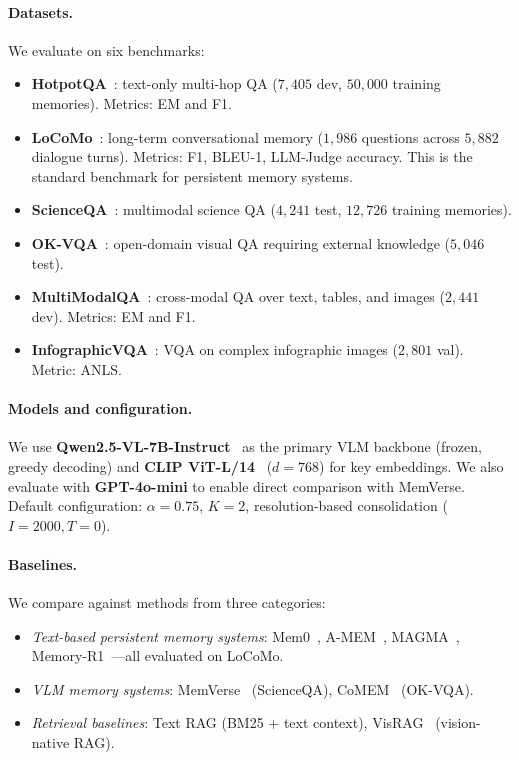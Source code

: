 \documentclass{article}
\begin{document}
\paragraph{Datasets.}
We evaluate on six benchmarks:
\begin{itemize}[nosep,leftmargin=*]
  \item \textbf{HotpotQA}~\citep{yang2018hotpotqa}: text-only multi-hop QA ($7{,}405$ dev, $50{,}000$ training memories). Metrics: EM and F1.
  \item \textbf{LoCoMo}~\citep{maharana2024locomo}: long-term conversational memory ($1{,}986$ questions across $5{,}882$ dialogue turns). Metrics: F1, BLEU-1, LLM-Judge accuracy. This is the standard benchmark for persistent memory systems.
  \item \textbf{ScienceQA}~\citep{lu2022learn}: multimodal science QA ($4{,}241$ test, $12{,}726$ training memories).
  \item \textbf{OK-VQA}~\citep{marino2019okvqa}: open-domain visual QA requiring external knowledge ($5{,}046$ test).
  \item \textbf{MultiModalQA}~\citep{talmor2021multimodalqa}: cross-modal QA over text, tables, and images ($2{,}441$ dev). Metrics: EM and F1.
  \item \textbf{InfographicVQA}~\citep{mathew2022infographicvqa}: VQA on complex infographic images ($2{,}801$ val). Metric: ANLS.
\end{itemize}

\paragraph{Models and configuration.}
We use \textbf{Qwen2.5-VL-7B-Instruct}~\citep{bai2025qwen25vl} as the primary VLM backbone (frozen, greedy decoding) and \textbf{CLIP ViT-L/14}~\citep{radford2021learning} ($d\!=\!768$) for key embeddings. We also evaluate with \textbf{GPT-4o-mini} to enable direct comparison with MemVerse. Default configuration: $\alpha\!=\!0.75$, $K\!=\!2$, resolution-based consolidation ($I\!=\!2000, T\!=\!0$).

\paragraph{Baselines.}
We compare against methods from three categories:
\begin{itemize}[nosep,leftmargin=*]
  \item \emph{Text-based persistent memory systems}: Mem0~\citep{mem0_2025}, A-MEM~\citep{zhao2025amem}, MAGMA~\citep{jiang2026magma}, Memory-R1~\citep{yan2025memoryr1}---all evaluated on LoCoMo.
  \item \emph{VLM memory systems}: MemVerse~\citep{lu2024memverse} (ScienceQA), CoMEM~\citep{wu2025comem} (OK-VQA).
  \item \emph{Retrieval baselines}: Text RAG (BM25 + text context), VisRAG~\citep{yu2025visrag} (vision-native RAG).
\end{itemize}
\end{document}
